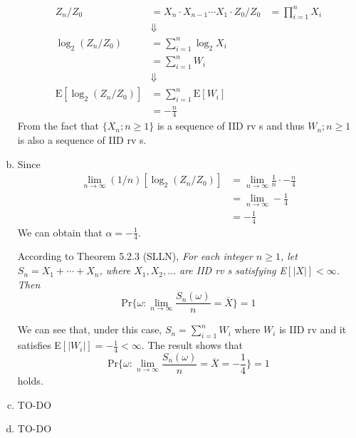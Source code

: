\documentclass{article}
\begin{document}
\begin{enumerate}[(a)]
            \begin{equation*}
                \begin{aligned}
                    Z_n/Z_0&=X_n\cdot X_{n-1}\cdots X_1\cdot Z_0/Z_0&=\prod_{i=1}^nX_i\\
                    &\Downarrow\\
                    \log_2(Z_n/Z_0)&=\sum_{i=1}^n\log_2X_i\\
                    &=\sum_{i=1}^nW_i\\
                    &\Downarrow\\
                    \text{E}[\log_2(Z_n/Z_0)] &= \sum_{i=1}^n\text{E}[W_i]\\
                    &=-\frac{n}{4}
                \end{aligned}
            \end{equation*}
            From the fact that $\{X_n;n\geq 1\}$ is a sequence of IID rv s and thus ${W_n;n\geq 1}$ is also a sequence of IID rv s.
        \item Since
            \begin{equation*}
                \begin{split}
                    \lim_{n\rightarrow\infty}(1/n)[\log_2(Z_n/Z_0)] &= \lim_{n\rightarrow\infty}\frac{1}{n}\cdot-\frac{n}{4}\\
                    &=\lim_{n\rightarrow\infty}-\frac{1}{4}\\
                    &=-\frac{1}{4}
                \end{split}
            \end{equation*}
            We can obtain that $\alpha=-\frac{1}{4}$.

            According to Theorem 5.2.3 (SLLN), \textit{For each integer $n\geq 1$, let $S_n=X_1+\cdots+X_n$, where $X_1,X_2,\dots$ are IID rv s satisfying \textnormal{E}$[|X|]<\infty$. Then}
            \begin{equation*}
                \text{Pr}\bigg\{\omega:\lim_{n\rightarrow\infty}\frac{S_n(\omega)}{n}=\overline{X}\bigg\}=1
            \end{equation*}

            We can see that, under this case, $S_n=\sum_{i=1}^nW_i$ where $W_i$ is IID rv and it satisfies E$[|W_i|]=-\frac{1}{4}<\infty$. The result shows that 
            \begin{equation*}
                \text{Pr}\bigg\{\omega:\lim_{n\rightarrow\infty}\frac{S_n(\omega)}{n}=\overline{X}=-\frac{1}{4}\bigg\}=1
            \end{equation*}
            holds.
        \item TO-DO
        \item TO-DO 
    \end{enumerate}
\end{document}
